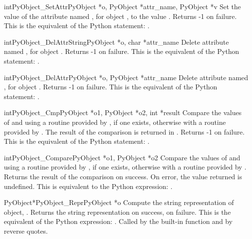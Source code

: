      \begin{cfuncdesc}{int}{PyObject_SetAttr}{PyObject *o, PyObject *attr_name, PyObject *v}
	 Set the value of the attribute named , for
	 object ,
	 to the value . Returns -1 on failure.  This is
	 the equivalent of the Python statement: .
     \end{cfuncdesc}


     \begin{cfuncdesc}{int}{PyObject_DelAttrString}{PyObject *o, char *attr_name}
	 Delete attribute named , for object . Returns -1 on
	 failure.  This is the equivalent of the Python
	 statement: .
     \end{cfuncdesc}


     \begin{cfuncdesc}{int}{PyObject_DelAttr}{PyObject *o, PyObject *attr_name}
	 Delete attribute named , for object . Returns -1 on
	 failure.  This is the equivalent of the Python
	 statement: .
     \end{cfuncdesc}


     \begin{cfuncdesc}{int}{PyObject_Cmp}{PyObject *o1, PyObject *o2, int *result}
	 Compare the values of  and  using a routine provided by
	 , if one exists, otherwise with a routine provided by .
	 The result of the comparison is returned in .  Returns
	 -1 on failure.  This is the equivalent of the Python
	 statement: .
     \end{cfuncdesc}


     \begin{cfuncdesc}{int}{PyObject_Compare}{PyObject *o1, PyObject *o2}
	 Compare the values of  and  using a routine provided by
	 , if one exists, otherwise with a routine provided by .
	 Returns the result of the comparison on success.  On error,
	 the value returned is undefined. This is equivalent to the
	 Python expression: .
     \end{cfuncdesc}


     \begin{cfuncdesc}{PyObject*}{PyObject_Repr}{PyObject *o}
	 Compute the string representation of object, .  Returns the
	 string representation on success, {\NULL} on failure.  This is
	 the equivalent of the Python expression: .
	 Called by the  built-in function and by reverse quotes.
     \end{cfuncdesc}


